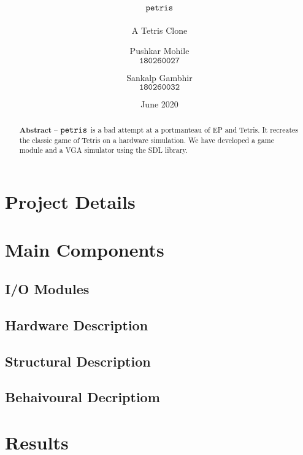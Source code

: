 \documentclass[10pt, a4paper, egregdoesnotlikesansseriftitles]{scrartcl}
\title{$\texttt{petris}$}
\subtitle{A Tetris Clone}
\author{
    Pushkar Mohile \\
    $\texttt{180260027}$
    \and
    Sankalp Gambhir \\
    $\texttt{180260032}$
    }
\date{June 2020}
\begin{document}
\maketitle

\begin{abstract}
    \centering
    $\textbf{Abstract --}$
    $\texttt{petris}$ is a bad attempt at a portmanteau of 
    EP and Tetris. It recreates the classic game of Tetris on a hardware simulation. We have developed a game module and a VGA simulator using the SDL library. 
\end{abstract}

  
\section{Project Details}


\section{Main Components}
\subsection{I/O Modules}

\subsection{Hardware Description}
\subsection{Structural Description }
\subsection{Behaivoural Decriptiom}


\section{Results}

\end{document}
